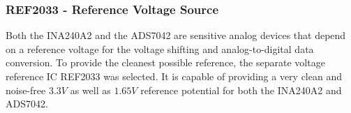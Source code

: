 \subsubsection{REF2033 - Reference Voltage Source}
Both the INA240A2 and the ADS7042 are sensitive analog devices that depend on a reference voltage for the voltage shifting and analog-to-digital data conversion.
To provide the cleanest possible reference, the separate voltage reference IC REF2033 was selected.
It is capable of providing a very clean and noise-free $3.3V$ as well as $1.65V$ reference potential for both the INA240A2 and ADS7042.
